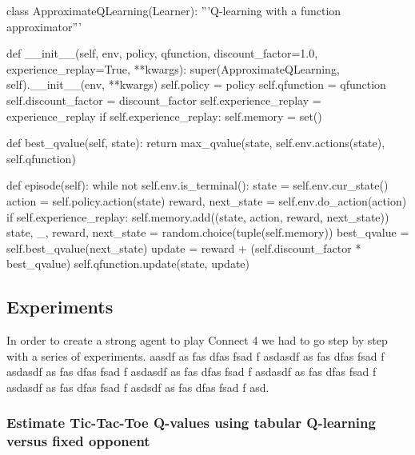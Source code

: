 \documentclass{article}
\begin{document}
\begin{python}
class ApproximateQLearning(Learner):
    '''Q-learning with a function approximator'''

    def __init__(self, env, policy, qfunction, discount_factor=1.0,
                 experience_replay=True, **kwargs):
        super(ApproximateQLearning, self).__init__(env, **kwargs)
        self.policy = policy
        self.qfunction = qfunction
        self.discount_factor = discount_factor
        self.experience_replay = experience_replay
        if self.experience_replay:
            self.memory = set()

    def best_qvalue(self, state):
        return max_qvalue(state, self.env.actions(state), self.qfunction)

    def episode(self):
        while not self.env.is_terminal():
            state = self.env.cur_state()
            action = self.policy.action(state)
            reward, next_state = self.env.do_action(action)
            if self.experience_replay:
                self.memory.add((state, action, reward, next_state))
                state, _, reward, next_state = random.choice(tuple(self.memory))
            best_qvalue = self.best_qvalue(next_state)
            update = reward + (self.discount_factor * best_qvalue)
            self.qfunction.update(state, update)

\end{python}

\pagebreak[4]

\subsection{Experiments}

In order to create a strong agent to play Connect 4 we had to go step by step with a series of
experiments. aasdf as fas dfas fsad f asdasdf as fas dfas fsad f asdasdf as fas dfas fsad f asdasdf
as fas dfas fsad f asdasdf as fas dfas fsad f asdasdf as fas dfas fsad f asdsdf as fas dfas fsad f
asd.

\subsubsection{Estimate Tic-Tac-Toe Q-values using tabular Q-learning versus fixed opponent}
\label{sec:tic-ql-tab-simple-fixed}
\end{document}
